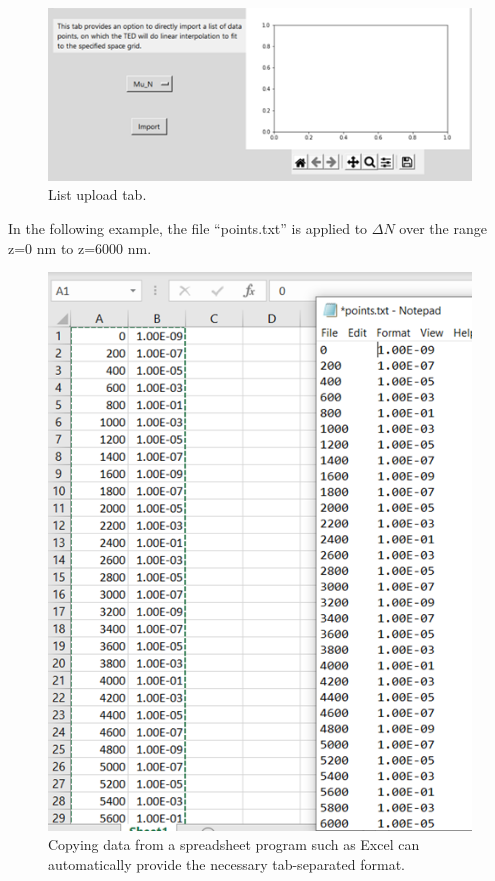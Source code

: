 \documentclass[11pt,letterpaper,titlepage]{article}
\begin{document}
		\begin{figure}[H]
			\label{fig:listupload_blank}
			\centering
			\includegraphics[scale=1]{"listupload_blank"}
			\caption{List upload tab.}
		\end{figure}
	
		\par In the following example, the file “points.txt” is applied to $\Delta N$ over the range z=0 nm to z=6000 nm.
		
		\begin{figure}[H]
			\label{fig:listupload_example}
			\centering
			\includegraphics[scale=1]{"listupload_example"}
			\caption{Copying data from a spreadsheet program such as Excel can automatically provide the necessary tab-separated format.}
		\end{figure}
		
\end{document}
